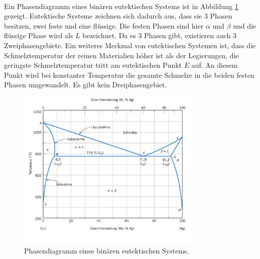 \documentclass[11pt,a4paper]{article}
\numberwithin{equation}{section}
\numberwithin{figure}{section}
\begin{document}
\\
\begin{addmargin}[25pt]{0pt}
Ein Phasendiagramm eines binären eutektischen Systems ist in Abbildung \ref{fig:Phasendiagramm_eutektisch} gezeigt. Eutektische Systeme zeichnen sich dadurch aus, dass sie 3 Phasen besitzen, zwei feste und eine flüssige. Die festen Phasen sind hier $\alpha$ und $\beta$ und die flüssige Phase wird als $L$ bezeichnet. Da es 3 Phasen gibt, existieren auch 3 Zweiphasengebiete. Ein weiteres Merkmal von eutektischen Systemen ist, dass die Schmelztemperatur der reinen Materialien höher ist als der Legierungen, die geringste Schmelztemperatur tritt am eutektischen Punkt $E$ auf. An diesem Punkt wird bei konstanter Temperatur die gesamte Schmelze in die beiden festen Phasen umgewandelt. Es gibt kein Dreiphasengebiet.\\   
\begin{figure}[h]
    \centering
    \includegraphics[width = 0.8\textwidth]{images/Materialwissenschaften/eutektisch_Phasendiagramm.jpeg}
    \caption{Phasendiagramm eines binären eutektischen Systems.}
    \label{fig:Phasendiagramm_eutektisch}
\end{figure}
\end{addmargin}
\end{document}
